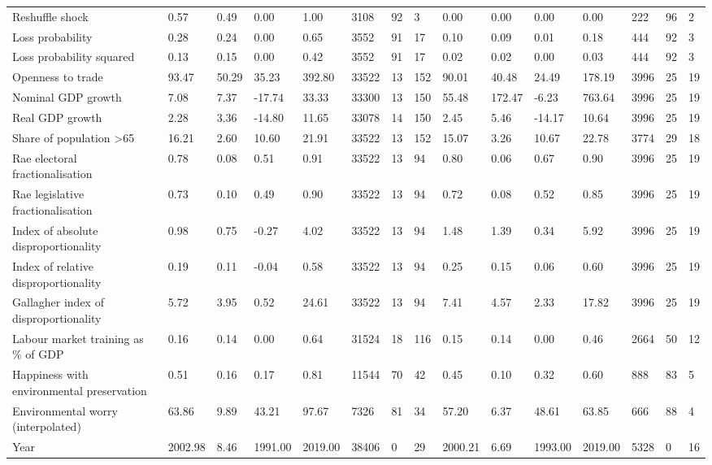 \begin{longtable}{lllllllllllllll}
Reshuffle shock & 0.57 & 0.49 & 0.00 & 1.00 & 3108 & 92 & 3 & 0.00 & 0.00 & 0.00 & 0.00 & 222 & 96 & 2\\
\addlinespace
Loss probability & 0.28 & 0.24 & 0.00 & 0.65 & 3552 & 91 & 17 & 0.10 & 0.09 & 0.01 & 0.18 & 444 & 92 & 3\\
Loss probability squared & 0.13 & 0.15 & 0.00 & 0.42 & 3552 & 91 & 17 & 0.02 & 0.02 & 0.00 & 0.03 & 444 & 92 & 3\\
Openness to trade & 93.47 & 50.29 & 35.23 & 392.80 & 33522 & 13 & 152 & 90.01 & 40.48 & 24.49 & 178.19 & 3996 & 25 & 19\\
Nominal GDP growth & 7.08 & 7.37 & -17.74 & 33.33 & 33300 & 13 & 150 & 55.48 & 172.47 & -6.23 & 763.64 & 3996 & 25 & 19\\
Real GDP growth & 2.28 & 3.36 & -14.80 & 11.65 & 33078 & 14 & 150 & 2.45 & 5.46 & -14.17 & 10.64 & 3996 & 25 & 19\\
\addlinespace
Share of population >65 & 16.21 & 2.60 & 10.60 & 21.91 & 33522 & 13 & 152 & 15.07 & 3.26 & 10.67 & 22.78 & 3774 & 29 & 18\\
Rae electoral fractionalisation & 0.78 & 0.08 & 0.51 & 0.91 & 33522 & 13 & 94 & 0.80 & 0.06 & 0.67 & 0.90 & 3996 & 25 & 19\\
Rae legislative fractionalisation & 0.73 & 0.10 & 0.49 & 0.90 & 33522 & 13 & 94 & 0.72 & 0.08 & 0.52 & 0.85 & 3996 & 25 & 19\\
Index of absolute disproportionality & 0.98 & 0.75 & -0.27 & 4.02 & 33522 & 13 & 94 & 1.48 & 1.39 & 0.34 & 5.92 & 3996 & 25 & 19\\
Index of relative disproportionality & 0.19 & 0.11 & -0.04 & 0.58 & 33522 & 13 & 94 & 0.25 & 0.15 & 0.06 & 0.60 & 3996 & 25 & 19\\
\addlinespace
Gallagher index of disproportionality & 5.72 & 3.95 & 0.52 & 24.61 & 33522 & 13 & 94 & 7.41 & 4.57 & 2.33 & 17.82 & 3996 & 25 & 19\\
Labour market training as \% of GDP & 0.16 & 0.14 & 0.00 & 0.64 & 31524 & 18 & 116 & 0.15 & 0.14 & 0.00 & 0.46 & 2664 & 50 & 12\\
Happiness with environmental preservation & 0.51 & 0.16 & 0.17 & 0.81 & 11544 & 70 & 42 & 0.45 & 0.10 & 0.32 & 0.60 & 888 & 83 & 5\\
Environmental worry (interpolated) & 63.86 & 9.89 & 43.21 & 97.67 & 7326 & 81 & 34 & 57.20 & 6.37 & 48.61 & 63.85 & 666 & 88 & 4\\
Year & 2002.98 & 8.46 & 1991.00 & 2019.00 & 38406 & 0 & 29 & 2000.21 & 6.69 & 1993.00 & 2019.00 & 5328 & 0 & 16\\
\bottomrule
\end{longtable}
